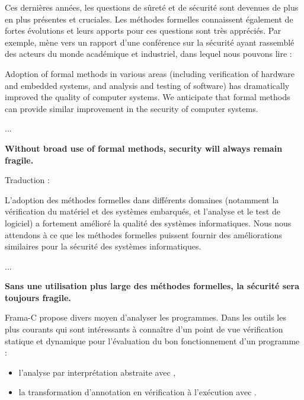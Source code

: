 Ces dernières années, les questions de sûreté et de sécurité sont devenues de
plus en plus présentes et cruciales. Les méthodes formelles connaissent également
de fortes évolutions et leurs apports pour ces questions sont très appréciés. 
Par exemple,  mène vers
un rapport d'une conférence sur la sécurité ayant rassemblé des acteurs du monde
académique et industriel, dans lequel nous pouvons lire :



\begin{Quotation}
Adoption of formal methods in various areas (including verification of hardware
and embedded systems, and analysis and testing of software) has dramatically 
improved the quality of computer systems.  We anticipate that formal methods 
can provide similar improvement in the security of computer systems.

...

\textbf{Without broad use of formal methods, security will always remain fragile.}
\end{Quotation}



\begin{Spoiler}
Traduction :

L'adoption des méthodes formelles dans différents domaines (notamment la 
vérification du matériel et des systèmes embarqués, et l'analyse et le test
de logiciel) a fortement amélioré la qualité des systèmes informatiques. 
Nous nous attendons à ce que les méthodes formelles puissent fournir des 
améliorations similaires pour la sécurité des systèmes informatiques.

...

\textbf{Sans une utilisation plus large des méthodes formelles, la sécurité sera
toujours fragile.}
\end{Spoiler}






Frama-C propose divers moyen d'analyser les programmes. Dans les outils les
plus courants qui sont intéressants à connaître d'un point de vue vérification
statique et dynamique pour l'évaluation du bon fonctionnement d'un programme :



\begin{itemize}
\item l'analyse par interprétation abstraite avec 
,
\item la transformation d'annotation en vérification à l'exécution avec 
.
\end{itemize}


